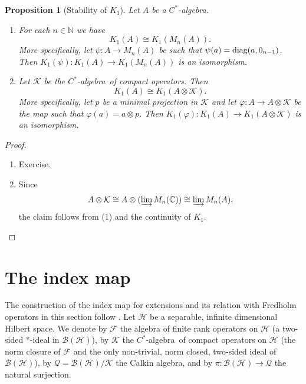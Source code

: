 \documentclass{book}
\newtheorem{proposition}[definition]{Proposition}
\def\cstar{\(C^*\)-algebra}
\def\diag{\textnormal{diag}}
\begin{document}
\begin{proposition}[Stability of \(K_1\)]
  Let \(A\) be a \cstar.
  \begin{enumerate}
    \item For each \(n\in\mathbb{N}\) we have
    \[
      K_1(A)\cong K_1(M_n(A)).
    \]
    More specifically, let \(\psi:A\rightarrow M_n(A)\) be such that \(\psi(a)=\diag(a,0_{n-1})\). Then \(K_1(\psi):K_1(A)\rightarrow K_1(M_n(A))\) is an isomorphism.
    \item Let \(\mathcal{K}\) be the \cstar\ of compact operators. Then 
      \[
        K_1(A)\cong K_1(A\otimes\mathcal{K}).
      \]
      More specifically, let \(p\) be a minimal projection in \(\mathcal{K}\) and let \(\varphi:A\rightarrow A\otimes\mathcal{K}\) be the map
      such that \(\varphi(a)=a\otimes p\). Then \(K_1(\varphi):K_1(A) \rightarrow K_1(A\otimes \mathcal{K})\) is an isomorphism.
  \end{enumerate}
\end{proposition}
\begin{proof}
  \begin{enumerate}
    \item Exercise.
    \item Since
    \[
      A\otimes\mathcal{K}\cong A\otimes (\varinjlim M_n(\mathbb{C}))\cong \varinjlim M_n(A),
    \]
    the claim follows from (1) and the continuity of \(K_1\).
  \end{enumerate}
\end{proof}

\section{The index map}
The construction of the index map for extensions and its relation with Fredholm
operators in this section follow \cite[Sections~9.1--9.4]{RordamLarsenLaustsen2000}.
Let \(\mathcal{H}\) be a separable, infinite dimensional Hilbert space. We denote by \(\mathcal{F}\)
the algebra of finite rank operators on \(\mathcal{H}\) (a two-sided *-ideal in \(\mathcal{B}(\mathcal{H})\)),
by \(\mathcal{K}\) the \cstar\ of compact operators on \(\mathcal{H}\) (the norm closure of \(\mathcal{F}\) and the only non-trivial, norm closed, two-sided
ideal of \(\mathcal{B}(\mathcal{H})\)), by \(\mathcal{Q}=\mathcal{B}(\mathcal{H})/\mathcal{K}\) the Calkin algebra, and by \(\pi:\mathcal{B}(\mathcal{H})\rightarrow\mathcal{Q}\)
the natural surjection.
  
\end{document}
